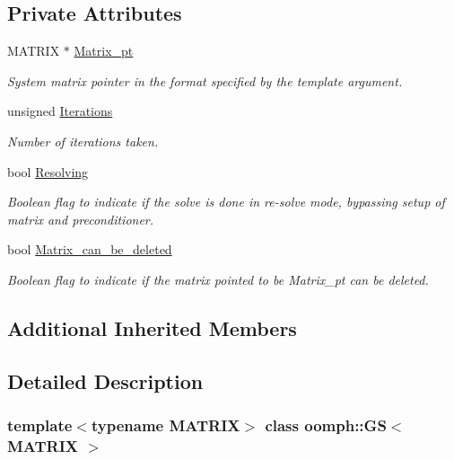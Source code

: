\subsection*{Private Attributes}
\begin{DoxyCompactItemize}
\item 
M\+A\+T\+R\+IX $\ast$ \hyperlink{classoomph_1_1GS_aac984c7e63198b6b6d8b32685f45c592}{Matrix\+\_\+pt}
\begin{DoxyCompactList}\small\item\em System matrix pointer in the format specified by the template argument. \end{DoxyCompactList}\item 
unsigned \hyperlink{classoomph_1_1GS_a3cef5f6067f391b7db9659d065a27cb5}{Iterations}
\begin{DoxyCompactList}\small\item\em Number of iterations taken. \end{DoxyCompactList}\item 
bool \hyperlink{classoomph_1_1GS_a8010d1c317927e493c22010623a10c04}{Resolving}
\begin{DoxyCompactList}\small\item\em Boolean flag to indicate if the solve is done in re-\/solve mode, bypassing setup of matrix and preconditioner. \end{DoxyCompactList}\item 
bool \hyperlink{classoomph_1_1GS_a718861f4e791d4db2838dfb08dd846a2}{Matrix\+\_\+can\+\_\+be\+\_\+deleted}
\begin{DoxyCompactList}\small\item\em Boolean flag to indicate if the matrix pointed to be Matrix\+\_\+pt can be deleted. \end{DoxyCompactList}\end{DoxyCompactItemize}
\subsection*{Additional Inherited Members}


\subsection{Detailed Description}
\subsubsection*{template$<$typename M\+A\+T\+R\+IX$>$\newline
class oomph\+::\+G\+S$<$ M\+A\+T\+R\+I\+X $>$}

